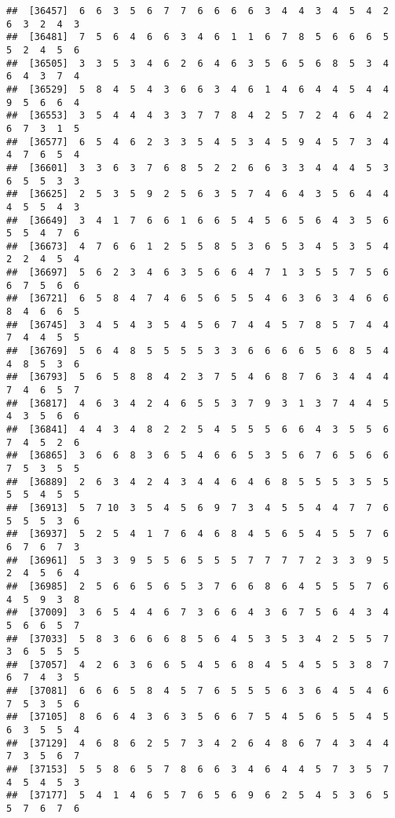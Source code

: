 \documentclass[
]{book}
\begin{document}
\begin{verbatim}
##  [36457]  6  6  3  5  6  7  7  6  6  6  6  3  4  4  3  4  5  4  2  6  3  2  4  3
##  [36481]  7  5  6  4  6  6  3  4  6  1  1  6  7  8  5  6  6  6  5  5  2  4  5  6
##  [36505]  3  3  5  3  4  6  2  6  4  6  3  5  6  5  6  8  5  3  4  6  4  3  7  4
##  [36529]  5  8  4  5  4  3  6  6  3  4  6  1  4  6  4  4  5  4  4  9  5  6  6  4
##  [36553]  3  5  4  4  4  3  3  7  7  8  4  2  5  7  2  4  6  4  2  6  7  3  1  5
##  [36577]  6  5  4  6  2  3  3  5  4  5  3  4  5  9  4  5  7  3  4  4  7  6  5  4
##  [36601]  3  3  6  3  7  6  8  5  2  2  6  6  3  3  4  4  4  5  3  6  5  5  3  3
##  [36625]  2  5  3  5  9  2  5  6  3  5  7  4  6  4  3  5  6  4  4  4  5  5  4  3
##  [36649]  3  4  1  7  6  6  1  6  6  5  4  5  6  5  6  4  3  5  6  5  5  4  7  6
##  [36673]  4  7  6  6  1  2  5  5  8  5  3  6  5  3  4  5  3  5  4  2  2  4  5  4
##  [36697]  5  6  2  3  4  6  3  5  6  6  4  7  1  3  5  5  7  5  6  6  7  5  6  6
##  [36721]  6  5  8  4  7  4  6  5  6  5  5  4  6  3  6  3  4  6  6  8  4  6  6  5
##  [36745]  3  4  5  4  3  5  4  5  6  7  4  4  5  7  8  5  7  4  4  7  4  4  5  5
##  [36769]  5  6  4  8  5  5  5  5  3  3  6  6  6  6  5  6  8  5  4  4  8  5  3  6
##  [36793]  5  6  5  8  8  4  2  3  7  5  4  6  8  7  6  3  4  4  4  7  4  6  5  7
##  [36817]  4  6  3  4  2  4  6  5  5  3  7  9  3  1  3  7  4  4  5  4  3  5  6  6
##  [36841]  4  4  3  4  8  2  2  5  4  5  5  5  6  6  4  3  5  5  6  7  4  5  2  6
##  [36865]  3  6  6  8  3  6  5  4  6  6  5  3  5  6  7  6  5  6  6  7  5  3  5  5
##  [36889]  2  6  3  4  2  4  3  4  4  6  4  6  8  5  5  5  3  5  5  5  5  4  5  5
##  [36913]  5  7 10  3  5  4  5  6  9  7  3  4  5  5  4  4  7  7  6  5  5  5  3  6
##  [36937]  5  2  5  4  1  7  6  4  6  8  4  5  6  5  4  5  5  7  6  6  7  6  7  3
##  [36961]  5  3  3  9  5  5  6  5  5  5  7  7  7  7  2  3  3  9  5  2  4  5  6  4
##  [36985]  2  5  6  6  5  6  5  3  7  6  6  8  6  4  5  5  5  7  6  4  5  9  3  8
##  [37009]  3  6  5  4  4  6  7  3  6  6  4  3  6  7  5  6  4  3  4  5  6  6  5  7
##  [37033]  5  8  3  6  6  6  8  5  6  4  5  3  5  3  4  2  5  5  7  3  6  5  5  5
##  [37057]  4  2  6  3  6  6  5  4  5  6  8  4  5  4  5  5  3  8  7  6  7  4  3  5
##  [37081]  6  6  6  5  8  4  5  7  6  5  5  5  6  3  6  4  5  4  6  7  5  3  5  6
##  [37105]  8  6  6  4  3  6  3  5  6  6  7  5  4  5  6  5  5  4  5  6  3  5  5  4
##  [37129]  4  6  8  6  2  5  7  3  4  2  6  4  8  6  7  4  3  4  4  7  3  5  6  7
##  [37153]  5  5  8  6  5  7  8  6  6  3  4  6  4  4  5  7  3  5  7  4  5  4  5  3
##  [37177]  5  4  1  4  6  5  7  6  5  6  9  6  2  5  4  5  3  6  5  5  7  6  7  6

\end{verbatim}
\end{document}
